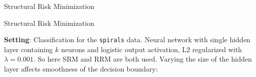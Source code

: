 \begin{vbframe} {Structural Risk Minimization}
\end{vbframe}

\begin{frame} {Structural Risk Minimization}

\small

\textbf{Setting}: Classification for the \texttt{spirals} data.
Neural network with single hidden layer containing $k$ neurons and logistic
output activation, L2 regularized with $\lambda = 0.001$.
So here SRM and RRM are both used.
Varying the size of the hidden layer affects smoothness of the decision boundary:


\vfill



\end{frame}
